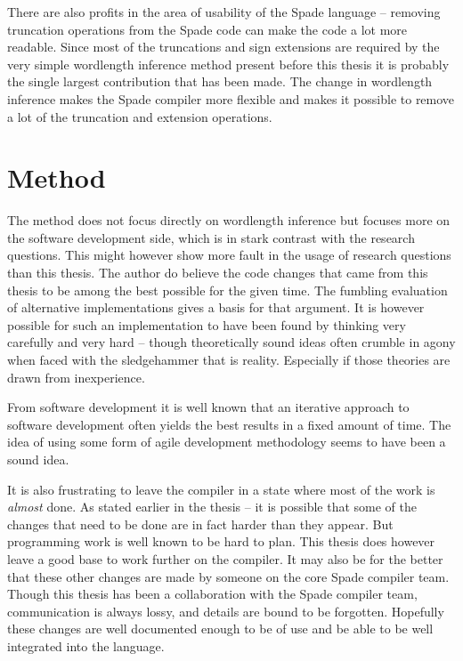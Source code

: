 There are also profits in the area of usability of the Spade language -- removing truncation operations from the Spade code can make the code a lot more readable. Since most of the truncations and sign extensions are required by the very simple wordlength inference method present before this thesis it is probably the single largest contribution that has been made. The change in wordlength inference makes the Spade compiler more flexible and makes it possible to remove a lot of the truncation and extension operations.

\section{Method}
The method does not focus directly on wordlength inference but focuses more on the software development side, which is in stark contrast with the research questions. This might however show more fault in the usage of research questions than this thesis. The author do believe the code changes that came from this thesis to be among the best possible for the given time. The fumbling evaluation of alternative implementations gives a basis for that argument. It is however possible for such an implementation to have been found by thinking very carefully and very hard -- though theoretically sound ideas often crumble in agony when faced with the sledgehammer that is reality. Especially if those theories are drawn from inexperience.

From software development it is well known that an iterative approach to software development often yields the best results in a fixed amount of time. The idea of using some form of agile development methodology seems to have been a sound idea.

It is also frustrating to leave the compiler in a state where most of the work is \textit{almost} done. As stated earlier in the thesis -- it is possible that some of the changes that need to be done are in fact harder than they appear. But programming work is well known to be hard to plan. This thesis does however leave a good base to work further on the compiler. It may also be for the better that these other changes are made by someone on the core Spade compiler team. Though this thesis has been a collaboration with the Spade compiler team, communication is always lossy, and details are bound to be forgotten. Hopefully these changes are well documented enough to be of use and be able to be well integrated into the language.

